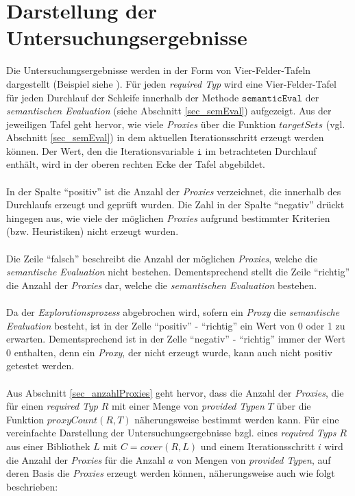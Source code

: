 \section{Darstellung der Untersuchungsergebnisse}
Die Untersuchungsergebnisse werden in der Form von Vier-Felder-Tafeln dargestellt (Beispiel siehe ). Für jeden \emph{required Typ} wird eine Vier-Felder-Tafel für jeden Durchlauf der Schleife innerhalb der Methode $\texttt{semanticEval}$ der \emph{semantischen Evaluation} (siehe Abschnitt \ref{sec_semEval}) aufgezeigt. Aus der jeweiligen Tafel geht hervor, wie viele \emph{Proxies} über die Funktion $\mathit{targetSets}$ (vgl. Abschnitt \ref{sec_semEval}) in dem aktuellen Iterationsschritt erzeugt werden können. Der Wert, den die Iterationsvariable $\texttt{i}$ im betrachteten Durchlauf enthält, wird in der oberen rechten Ecke der Tafel abgebildet.
\\\\
In der Spalte ``positiv'' ist die Anzahl der \emph{Proxies} verzeichnet, die innerhalb des Durchlaufs erzeugt und geprüft wurden. Die Zahl in der Spalte ``negativ'' drückt hingegen aus, wie viele der möglichen \emph{Proxies} aufgrund bestimmter Kriterien (bzw. \Gls{Heuristik}en) nicht erzeugt wurden. 
\\\\
Die Zeile ``falsch'' beschreibt die Anzahl der möglichen \emph{Proxies}, welche die \emph{semantische Evaluation} nicht bestehen. Dementsprechend stellt die Zeile ``richtig'' die Anzahl der \emph{Proxies} dar, welche die \emph{semantischen Evaluation} bestehen.
\\\\
Da der \emph{Explorationsprozess} abgebrochen wird, sofern ein \emph{Proxy} die \emph{semantische Evaluation} besteht, ist in der Zelle ``positiv'' - ``richtig'' ein Wert von 0 oder 1 zu erwarten. Dementsprechend ist in der Zelle ``negativ'' - ``richtig'' immer der Wert 0 enthalten, denn ein \emph{Proxy}, der nicht erzeugt wurde, kann auch nicht positiv getestet werden.
\\\\
Aus Abschnitt \ref{sec_anzahlProxies} geht hervor, dass die Anzahl der \emph{Proxies}, die für einen \emph{required Typ} $R$ mit einer Menge von \emph{provided Typen} $T$ über die Funktion $\mathit{proxyCount(R,T)}$ näherungsweise bestimmt werden kann. Für eine vereinfachte Darstellung der Untersuchungsergebnisse bzgl. eines \emph{required Typs} $R$ aus einer Bibliothek $L$ mit $C = \mathit{cover(R,L)}$ und einem Iterationsschritt $i$ wird die Anzahl der \emph{Proxies} für die Anzahl $a$ von Mengen von \emph{provided Typen}, auf deren Basis die \emph{Proxies} erzeugt werden können, näherungsweise auch wie folgt beschrieben:
